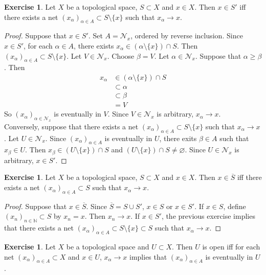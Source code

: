 \documentclass[12pt]{amsart}
\theoremstyle{definition}
\newtheorem{ex}[definition]{Exercise}
\newcommand{\al}{\alpha}
\newcommand{\be}{\beta}
\newcommand{\N}{\mathbb{N}}
\newcommand{\MN}{\mathcal{N}}
\newcommand{\lex}[1]{\label{ex:#1}}
\begin{document}
	\begin{ex} \lex{33008}
	Let $X$ be a topological space, $S \subset X$ and $x \in X$. Then $x \in S'$ iff there exists a net $(x_{\al})_{\al \in A} \subset S \setminus \{x\}$ such that $x_{\al} \rightarrow x$. 
	\end{ex}

	\begin{proof}
	Suppose that $x \in S'$. Set $A = \MN_x$, ordered by reverse inclusion.  Since $x \in S'$, for each $\al \in A$, there exists $x_\al \in (\al \setminus \{x\}) \cap S.$ Then $(x_{\al})_{\al \in A} \subset S \setminus \{x\}$. Let $V \in \MN_x$. Choose $\be = V$. Let $\al \in \MN_x$. Suppose that $\al \geq \be$. Then 
	\begin{align*}
	x_{\al} 
	&\in (\al \setminus \{x\}) \cap S \\
	& \subset \al \\
	& \subset \be \\
	&= V
\end{align*}	
	So $(x_{\al})_{\al \in \MN_x}$ is eventually in $V$. Since $V \in \MN_x$ is arbitrary, $x_{\al } \rightarrow x$. \\
	Conversely, suppose that there exists a net $(x_{\al})_{\al \in A} \subset S \setminus \{x\}$ such that $x_{\al} \rightarrow x$. Let $U \in \MN_x$. Since $(x_{\al})_{\al \in A}$ is eventually in $U$, there exits $\be \in A$ such that $x_{\be} \in U$. Then $x_{\be} \in (U \setminus \{x\}) \cap S$ and $(U \setminus \{x\}) \cap S \neq \varnothing$. Since $U \in \MN_x$ is arbitrary, $x \in S'$.
	\end{proof}
	
	\begin{ex} \lex{33009}
	Let $X$ be a topological space, $S \subset X$ and $x \in X$. Then $x \in \overline{S}$ iff there exists a net $(x_{\al})_{\al \in A} \subset S$ such that $x_{\al} \rightarrow x$. 
	\end{ex}

	\begin{proof}
	Suppose that $x \in \overline{S}$. Since $\overline{S} = S \cup S'$, $x \in S$ or $x \in S'$. If $x \in S$, define $(x_n)_{n \in \N} \subset S$ by $x_n = x$. Then $x_n \rightarrow x$. If $x \in S'$, the previous exercise implies that there exists a net $(x_{\al})_{\al \in A} \subset S \setminus \{x\} \subset S$ such that $x_{\al} \rightarrow x$. 
	\end{proof}

	\begin{ex}
		Let $X$ be a topological space and $U \subset X$. Then $U$ is open iff for each net $(x_{\al})_{\al \in A} \subset X$ and $x \in U$, $x_{\al} \rightarrow x$ implies that $(x_{\al})_{\al \in A} $ is eventually in $U$.
	\end{ex}
\end{document}
